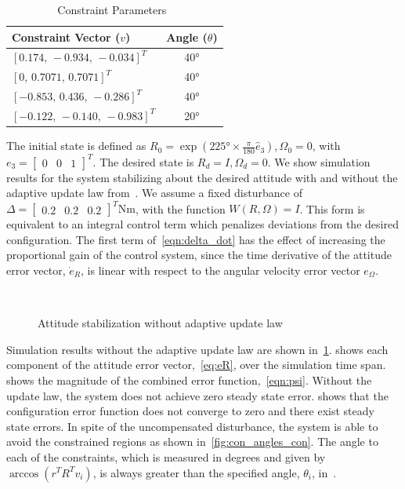 \begin{table}[htbp]
    \centering
\begin{tabular}{lc}
    \toprule
Constraint Vector (\( v \)) & Angle (\( \theta \)) \\ 
\midrule
\([0.174,\,-0.934,\, -0.034]^T\) & \ang{40} \\ 
\([0 ,\, 0.7071 ,\, 0.7071]^T\) & \ang{40} \\ 
\([-0.853 ,\, 0.436 ,\, -0.286]^T\) & \ang{40} \\ 
\([-0.122 ,\,-0.140,\, -0.983]^T\) & \ang{20} \\
\bottomrule
\end{tabular} 
\caption{Constraint Parameters~\label{tab:constraints}}
\end{table}
The initial state is defined as \(R_0 =  \exp(\ang{225} \times \frac{\pi}{180} \hat{e}_3), \Omega_0 = 0\), with \( e_3 = \begin{bmatrix} 0 & 0 & 1 \end{bmatrix}^T \).
The desired state is \( R_d = I,\Omega_d = 0\).
We show simulation results for the system stabilizing about the desired attitude with and without the adaptive update law from~.
We assume a fixed disturbance of \(\Delta = \begin{bmatrix} 0.2 & 0.2 & 0.2 \end{bmatrix}^T \si{\newton\meter}\), with the function \( W(R,\Omega) = I \).
This form is equivalent to an integral control term which penalizes deviations from the desired configuration.
The first term of~\cref{eqn:delta_dot} has the effect of increasing the proportional gain of the control system, since the time derivative of the attitude error vector, \( \dot{e}_{R} \), is linear with respect to the angular velocity error vector \( e_\Omega\).

\begin{figure}[t]
    \centering 
    ~
    ~
   ~
    \caption{Attitude stabilization without adaptive update law}
    \label{fig:con} 
\end{figure}
Simulation results without the adaptive update law are shown in~\cref{fig:con}.
 shows each component of the attitude error vector,~\cref{eq:eR}, over the simulation time span.
 shows the  magnitude of the combined error function,~\cref{eqn:psi}.
Without the update law, the system does not achieve zero steady state error. 
 shows that the configuration error function does not converge to zero and there exist steady state errors.
In spite of the uncompensated disturbance, the system is able to avoid the constrained regions as shown in~\cref{fig:con_angles_con}.
The angle to each of the constraints, which is measured in degrees and given by \( \arccos(r^T R^T v_i) \), is always greater than the specified angle, \( \theta_i \), in~.

